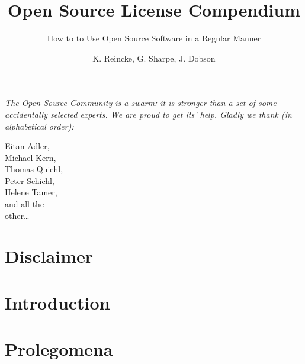 \documentclass[DIV=calc,BCOR=5mm,12pt,headings=small,oneside,abstract=true,
toc=bib]{scrbook}
\begin{document}
\nocite{*}

\titlehead{Release }
\subject{\small \itshape A Practical Guide for Developers, Managers, Companies,
and OS Experts}
\title{Open Source License Compendium}
\subtitle{How to to Use Open Source Software in a Regular Manner}
\author{K. Reincke, G. Sharpe, J. Dobson }
\maketitle

\footnotesize
\begin{flushright} 

\parbox{100mm}{\itshape
The Open Source Community is a swarm: it is stronger than a set of some
accidentally selected experts. We are proud to get its' help. Gladly we thank
(in alphabetical order):
}

\parbox{50mm}{
\tiny
\begin{flushright}
Eitan Adler,\\
Michael Kern,\\
Thomas Quiehl,\\
Peter Schichl,\\
Helene Tamer,\\
and all the \\
other\ldots
\end{flushright}
}
\end{flushright}
\normalsize
\newpage

\footnotesize
\tableofcontents
\newpage

\normalsize

\chapter*{Disclaimer}


\chapter{Introduction}



\chapter{Prolegomena}


%
\end{document}
